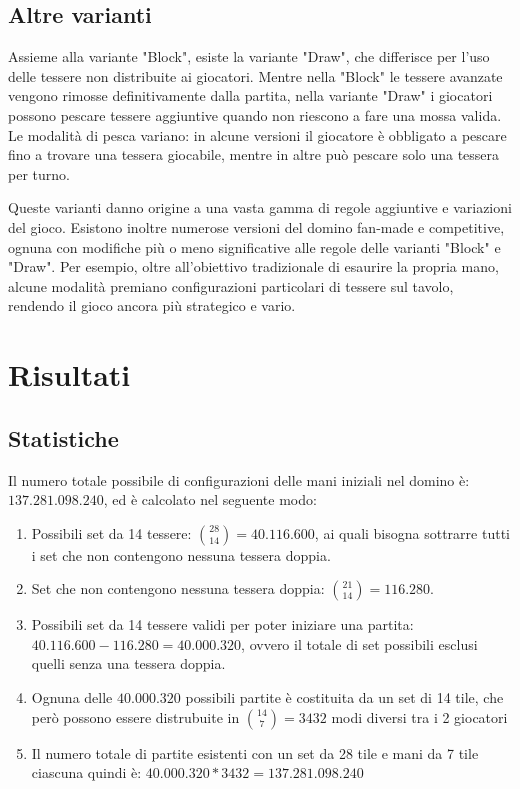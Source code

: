 \documentclass[a4paper.12pt]{report} %
\begin{document}
\section{Altre varianti}

Assieme alla variante "Block", esiste la variante "Draw", che differisce per l'uso delle tessere non distribuite ai giocatori. Mentre nella "Block" le tessere avanzate vengono rimosse definitivamente dalla partita, nella variante "Draw" i giocatori possono pescare tessere aggiuntive quando non riescono a fare una mossa valida. Le modalità di pesca variano: in alcune versioni il giocatore è obbligato a pescare fino a trovare una tessera giocabile, mentre in altre può pescare solo una tessera per turno.


Queste varianti danno origine a una vasta gamma di regole aggiuntive e variazioni del gioco. Esistono inoltre numerose versioni del domino fan-made e competitive, ognuna con modifiche più o meno significative alle regole delle varianti "Block" e "Draw". Per esempio, oltre all’obiettivo tradizionale di esaurire la propria mano, alcune modalità premiano configurazioni particolari di tessere sul tavolo, rendendo il gioco ancora più strategico e vario.


\chapter{Risultati}

\section{Statistiche}

Il numero totale possibile di configurazioni delle mani iniziali nel domino è: \(137.281.098.240\), ed è calcolato nel seguente modo:


\begin{enumerate}
    \item Possibili set da 14 tessere: \(\binom{28}{14} = 40.116.600\), ai quali bisogna sottrarre tutti i set che non contengono nessuna tessera doppia.
    \item Set che non contengono nessuna tessera doppia: \(\binom{21}{14} = 116.280\).
    \item Possibili set da 14 tessere validi per poter iniziare una partita: \(40.116.600 - 116.280 = 40.000.320\), ovvero il totale di set possibili esclusi quelli senza una tessera doppia.
    \item Ognuna delle \(40.000.320\) possibili partite è costituita da un set di 14 tile, che però possono essere distrubuite in \(\binom{14}{7} = 3432\) modi diversi tra i 2 giocatori
    \item Il numero totale di partite esistenti con un set da 28 tile e mani da 7 tile ciascuna quindi è: \(40.000.320 * 3432 = 137.281.098.240\)
\end{enumerate}
\end{document}
